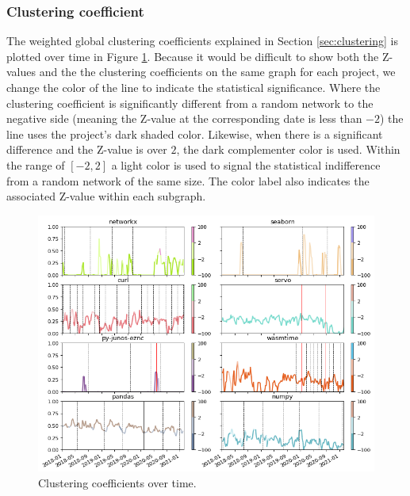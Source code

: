 \subsubsection{Clustering coefficient}

The weighted global clustering coefficients explained in Section \ref{sec:clustering} is plotted over time in Figure \ref{fig:clust}. Because it would be difficult to show both the Z-values and the the clustering coefficients on the same graph for each project, we change the color of the line to indicate the statistical significance. Where the clustering coefficient is significantly different from a random network to the negative side (meaning the Z-value at the corresponding date is less than $-2$) the line uses the project's dark shaded color. Likewise, when there is a significant difference and the Z-value is over $2$, the dark complementer color is used. Within the range of $[-2, 2]$ a light color is used to signal the statistical indifference from a random network of the same size. The color label also indicates the associated Z-value within each subgraph.

\begin{figure}
    \centering
    \includegraphics[width=\textwidth]{figures/qualitative/clustering_coeff/clustering.png}
    \caption{Clustering coefficients over time.}
    \label{fig:clust}
\end{figure}

